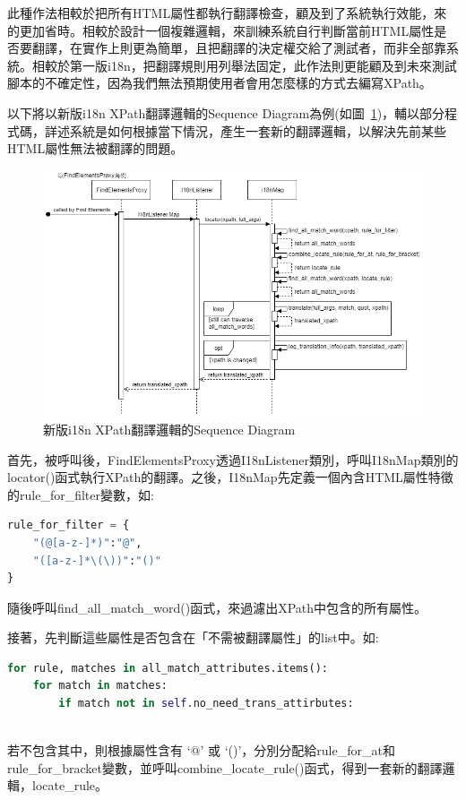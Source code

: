 此種作法相較於把所有HTML屬性都執行翻譯檢查，顧及到了系統執行效能，來的更加省時。相較於設計一個複雜邏輯，來訓練系統自行判斷當前HTML屬性是否要翻譯，在實作上則更為簡單，且把翻譯的決定權交給了測試者，而非全部靠系統。相較於第一版i18n，把翻譯規則用列舉法固定，此作法則更能顧及到未來測試腳本的不確定性，因為我們無法預期使用者會用怎麼樣的方式去編寫XPath。

以下將以新版i18n XPath翻譯邏輯的Sequence Diagram為例(如圖~\ref{新版i18n XPath翻譯邏輯的Sequence Diagram})，輔以部分程式碼，詳述系統是如何根據當下情況，產生一套新的翻譯邏輯，以解決先前某些HTML屬性無法被翻譯的問題。

\begin{figure}[H]
    \includegraphics[width= 1.1\textwidth]{../UML/i18n sequence diagram-xpath翻譯邏輯.png}
    \caption{新版i18n XPath翻譯邏輯的Sequence Diagram}
    \label{新版i18n XPath翻譯邏輯的Sequence Diagram}
\end{figure}

首先，被呼叫後，FindElementsProxy透過I18nListener類別，呼叫I18nMap類別的locator()函式執行XPath的翻譯。之後，I18nMap先定義一個內含HTML屬性特徵的rule\_for\_filter變數，如:
\begin{lstlisting}[language={python}]
rule_for_filter = {
    "(@[a-z-]*)":"@",
    "([a-z-]*\(\))":"()"
}
\end{lstlisting}
隨後呼叫find\_all\_match\_word()函式，來過濾出XPath中包含的所有屬性。

接著，先判斷這些屬性是否包含在「不需被翻譯屬性」的list中。如:
\begin{lstlisting}[language={python}]
for rule, matches in all_match_attributes.items():
    for match in matches:
        if match not in self.no_need_trans_attirbutes:
\end{lstlisting}
\hspace*{\fill} \\
若不包含其中，則根據屬性含有 ‘@’ 或 ‘()’，分別分配給rule\_for\_at和rule\_for\_bracket變數，並呼叫combine\_locate\_rule()函式，得到一套新的翻譯邏輯，locate\_rule。

